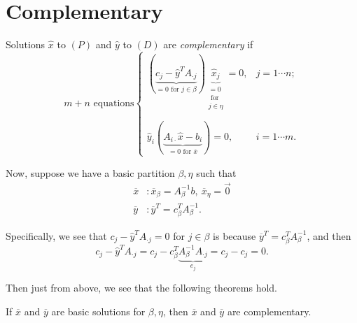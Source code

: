 \section{Complementary}
Solutions \(\hat{x}\) to \((P)\) and \(\hat{y}\) to \((D)\) are \emph{complementary} if
\[
	m+n\text{ equations}\begin{cases}
		(\underbrace{c_{j} - \hat{y}^{T} A_{\cdot j}}_{ = 0\text{ for }j\in \beta}) \underbrace{\hat{x}_j}_{ \substack{= 0 \\\text{ for }\\j\in \eta}} = 0, & j = 1\cdots n; \\\\
		\hat{y}_i(\underbrace{A_{i\cdot} \hat{x} - b_{i}}_{ = 0 \text{ for }\overline{x}}) = 0, & i = 1\cdots m.
	\end{cases}
\]

Now, suppose we have a basic partition \(\beta, \eta\) such that
\[
	\begin{split}
		\overline{x}&: \overline{x}_{\beta} = A^{-1}_{\beta}b,\ \overline{x}_{\eta} = \vec{0}\\
		\overline{y}&: \overline{y}^{T} = c^{T}_{\beta}A^{-1}_{\beta}.
	\end{split}
\]

\begin{note}
	Specifically, we see that \(c_{j} - \hat{y}^{T}A_{\cdot j} = 0\) for \(j\in\beta\) is because \(\overline{y}^{T} = c^{T}_{\beta}A^{-1}_{\beta}\), and then
	\[
		c_{j} - \hat{y}^{T}A_{\cdot j} = c_{j} - c^{T}_{\beta}\underbrace{A^{-1}_{\beta}A_{\cdot j}}_{e_{j}} = c_{j} - c_{j} = 0.
	\]
\end{note}

Then just from above, we see that the following theorems hold.
\begin{theorem}
	If \(\overline{x}\) and \(\overline{y}\) are basic solutions for \(\beta, \eta\), then \(\overline{x}\) and \(\overline{y}\) are
	complementary.
\end{theorem}


